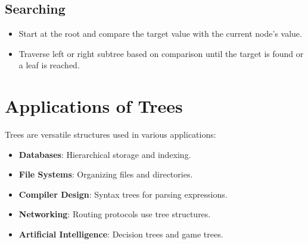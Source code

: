 \subsection{Searching}

\begin{itemize}
    \item Start at the root and compare the target value with the current node's value.
    \item Traverse left or right subtree based on comparison until the target is found or a leaf is reached.
\end{itemize}

\section{Applications of Trees}

Trees are versatile structures used in various applications:
\begin{itemize}
    \item \textbf{Databases}: Hierarchical storage and indexing.
    \item \textbf{File Systems}: Organizing files and directories.
    \item \textbf{Compiler Design}: Syntax trees for parsing expressions.
    \item \textbf{Networking}: Routing protocols use tree structures.
    \item \textbf{Artificial Intelligence}: Decision trees and game trees.
\end{itemize}
